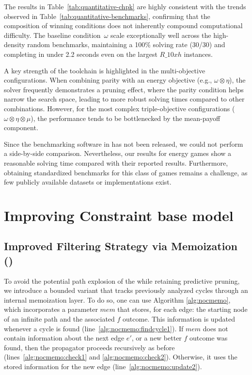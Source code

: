 \documentclass[a4paper,fleqn]{cas-sc}
\begin{document}
The results in Table~\ref{tab:quantitative-chpk} are highly consistent with the trends observed in Table~\ref{tab:quantitative-benchmarks}, confirming that the composition of winning conditions does not inherently compound computational difficulty. The baseline condition~$\omega$ scale exceptionally well across the high-density random benchmarks, maintaining a 100\% solving rate (30/30) and completing in under 2.2 seconds even on the largest $R\_10xh$ instances.

A key strength of the \nocq toolchain is highlighted in the multi-objective configurations. When combining parity with an energy objective (e.g., $\omega \otimes \eta$), the solver frequently demonstrates a pruning effect, where the parity condition helps narrow the search space, leading to more robust solving times compared to other combinations. However, for the most complex triple-objective configurations ($\omega \otimes \eta \otimes \mu$), the performance tends to be bottlenecked by the mean-payoff component.

Since the benchmarking software in \cite{Chaloupka:2011} has not been released, we could not perform a side-by-side comparison. Nevertheless, our results for energy games show a reasonable solving time compared with their reported results.  Furthermore, obtaining standardized benchmarks for this class of games remains a challenge, as few publicly available datasets or implementations exist.


\section{Improving Constraint base model}\label{sec:improved_cp}


\subsection{Improved Filtering Strategy via Memoization (\nocmemo)}\label{sec:nocmemo}

To avoid the potential path explosion of the \noceager while retaining predictive pruning, we introduce a bounded variant that tracks previously analyzed cycles through an internal memoization layer.
%
To do so, one can use Algorithm \ref{alg:nocmemo}, which incorporates a parameter $\textit{mem}$ that stores, for each edge: the starting node of an infinite path and the associated $f$ outcome. This information is updated whenever a cycle is found (line~\ref{alg:nocmemo:findcycle1}). If $\textit{mem}$ does not contain information about the next edge $e'$, or a new better $f$ outcome was found, then the propagator proceeds recursively as before (lines~\ref{alg:nocmemo:check1} and \ref{alg:nocmemo:check2}). Otherwise, it uses the stored information for the new edge (line~\ref{alg:nocmemo:update2}).
\end{document}
